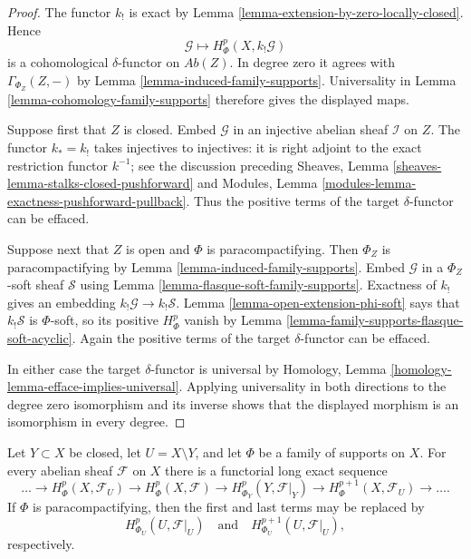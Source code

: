 \begin{proof}
The functor $k_!$ is exact by Lemma
\ref{lemma-extension-by-zero-locally-closed}. Hence
$$
\mathcal{G}\longmapsto H^p_\Phi(X,k_!\mathcal{G})
$$
is a cohomological $\delta$-functor on $\textit{Ab}(Z)$. In degree zero
it agrees with $\Gamma_{\Phi_Z}(Z,-)$ by Lemma
\ref{lemma-induced-family-supports}. Universality in Lemma
\ref{lemma-cohomology-family-supports} therefore gives the displayed
maps.

Suppose first that $Z$ is closed. Embed $\mathcal{G}$ in an injective
abelian sheaf $\mathcal{I}$ on $Z$. The functor $k_*=k_!$ takes
injectives to injectives: it is right adjoint to the exact restriction
functor $k^{-1}$; see the discussion preceding Sheaves, Lemma
\ref{sheaves-lemma-stalks-closed-pushforward} and Modules, Lemma
\ref{modules-lemma-exactness-pushforward-pullback}. Thus the positive
terms of the target $\delta$-functor can be effaced.

Suppose next that $Z$ is open and $\Phi$ is paracompactifying. Then
$\Phi_Z$ is paracompactifying by Lemma
\ref{lemma-induced-family-supports}. Embed $\mathcal{G}$ in a
$\Phi_Z$-soft sheaf $\mathcal{S}$ using Lemma
\ref{lemma-flasque-soft-family-supports}. Exactness of $k_!$ gives an
embedding $k_!\mathcal{G}\to k_!\mathcal{S}$. Lemma
\ref{lemma-open-extension-phi-soft} says that $k_!\mathcal{S}$ is
$\Phi$-soft, so its positive $H^p_\Phi$ vanish by Lemma
\ref{lemma-family-supports-flasque-soft-acyclic}. Again the positive
terms of the target $\delta$-functor can be effaced.

In either case the target $\delta$-functor is universal by Homology,
Lemma \ref{homology-lemma-efface-implies-universal}. Applying
universality in both directions to the degree zero isomorphism and its
inverse shows that the displayed morphism is an isomorphism in every
degree.
\end{proof}

\begin{lemma}
\label{lemma-family-supports-closed-open-exact-sequence}
\begin{reference}
\cite[Chapter III, \S 3.5, p. 167]{Tohoku}
\end{reference}
Let $Y\subset X$ be closed, let $U=X\setminus Y$, and let $\Phi$ be a
family of supports on $X$. For every abelian sheaf $\mathcal{F}$ on $X$
there is a functorial long exact sequence
$$
\ldots\to H^p_\Phi(X,\mathcal{F}_U)\to
H^p_\Phi(X,\mathcal{F})\to
H^p_{\Phi_Y}(Y,\mathcal{F}|_Y)\to
H^{p+1}_\Phi(X,\mathcal{F}_U)\to\ldots.
$$
If $\Phi$ is paracompactifying, then the first and last terms may be
replaced by
$$
H^p_{\Phi_U}(U,\mathcal{F}|_U)
\quad\text{and}\quad
H^{p+1}_{\Phi_U}(U,\mathcal{F}|_U),
$$
respectively.
\end{lemma}

